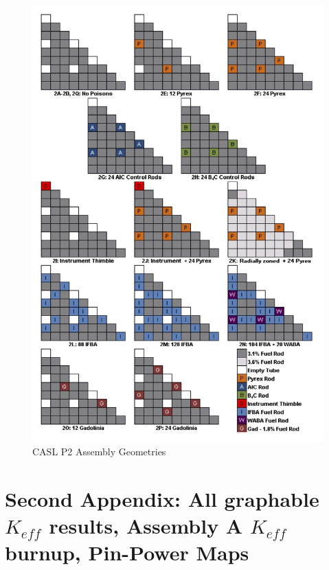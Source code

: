 \documentclass[12pt]{article}
\begin{document}
\begin{figure} [htb!]
\centering
\includegraphics[scale=0.38]{Figures/assemblies.jpg}
\caption{CASL P2 Assembly Geometries}
\end{figure}

\clearpage


\section{Second Appendix: All graphable $K_{eff}$ results, Assembly A $K_{eff}$ burnup, Pin-Power Maps}

\thispagestyle{empty}
\end{document}
